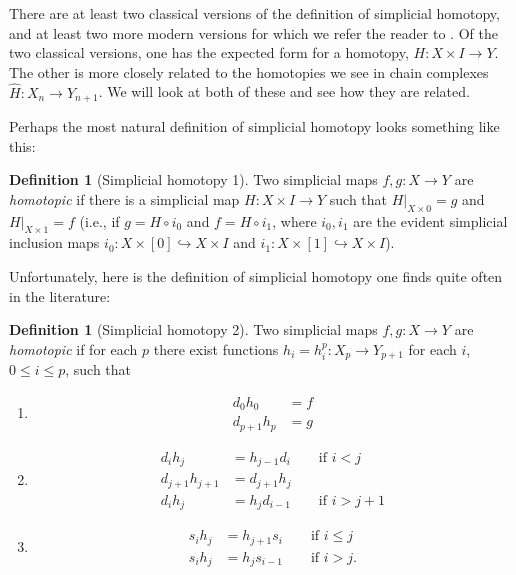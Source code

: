 \documentclass[12pt]{article}
\theoremstyle{plain}
\theoremstyle{definition}
\newtheorem{definition}[theorem]{Definition}
\newcommand{\into}{\hookrightarrow}
\begin{document}
There are at least two classical versions of the definition of simplicial homotopy, and at least two more modern versions for which we refer the reader to \cite{GoeJar}. Of the two classical versions, one has the expected form for a homotopy, $H\colon X\times I\to Y$. The other is more closely related to the homotopies we see in chain complexes $\widehat H\colon X_n\to Y_{n+1}$. We will look at both of these and see how they are related.

Perhaps the most natural definition of simplicial homotopy  looks something like  this:

\begin{definition}[Simplicial homotopy 1] 
Two simplicial maps $f,g\colon X\to Y$ are \emph{homotopic} if there is a simplicial map $H\colon X\times I\to Y$ such that $H|_{X\times 0}=g$ and $H|_{X\times 1}=f$ (i.e., if $g=H\circ i_0$ and $f=H\circ i_1$, where $i_0,i_1$ are the evident simplicial inclusion maps $i_0\colon X\times [0]\into X\times I$ and $i_1\colon X\times [1]\into X\times I$). 
\end{definition}



Unfortunately, here is the definition of simplicial homotopy one finds quite often in the literature:


\begin{definition}[Simplicial homotopy 2] \label{D: comb hom}
Two simplicial maps $f,g\colon X\to Y$ are \emph{homotopic} if for each $p$ there exist functions $h_i=h_i^p\colon X_p\to Y_{p+1}$ for each $i$, $0\leq i\leq p$, such that 
\begin{enumerate}
\item \begin{align*}d_0h_0&=f \\d_{p+1}h_p&=g \end{align*}
\item \begin{align*}
d_ih_j&=h_{j-1}d_i \qquad\text{if $i<j$}\\
d_{j+1}h_{j+1}&=d_{j+1}h_j\\
d_ih_j&=h_{j}d_{i-1} \qquad\text{if $i>j+1$}
\end{align*}
\item \begin{align*}
s_ih_j&=h_{j+1}s_i \qquad\text{if $i\leq j$}\\
s_ih_j&=h_{j}s_{i-1} \qquad\text{if $i>j$}.
\end{align*}
\end{enumerate}
\end{definition}
\end{document}
